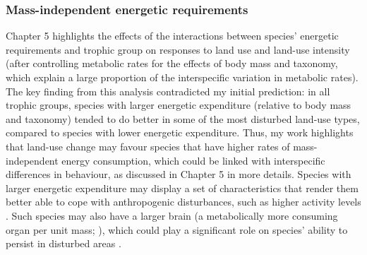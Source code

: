 
\subsubsection{Mass-independent energetic requirements}

Chapter 5 highlights the effects of the interactions between species' energetic requirements and trophic group on responses to land use and land-use intensity (after controlling metabolic rates for the effects of body mass and taxonomy, which explain a large proportion of the interspecific variation in metabolic rates). The key finding from this analysis contradicted my initial prediction: in all trophic groups, species with larger energetic expenditure (relative to body mass and taxonomy)  tended to do better in some of the most disturbed land-use types, compared to species with lower energetic expenditure. Thus, my work highlights that land-use change may favour species that have higher rates of mass-independent energy consumption, which could be linked with interspecific differences in behaviour, as discussed in Chapter 5 in more details. Species with larger energetic expenditure may display a set of characteristics that render them better able to cope with anthropogenic disturbances, such as higher activity levels \citep{Biro2010, Coogan2018}. Such species may also have a larger brain (a metabolically more consuming organ per unit mass; \citet{Isler2006}), which could play a significant role on species' ability to persist in disturbed areas \citep{Sayol2020}.

